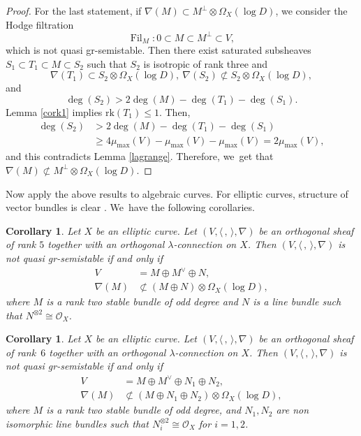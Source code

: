 \documentclass[11pt]{article}
\numberwithin{equation}{section}
\newcommand{\lconnection}{$\lambda$\nobreakdash-con\-nec\-tion\xspace}
\newcommand{\grsemistable}{gr\nobreakdash-semi\-stable\xspace}
\DeclareMathOperator{\Filt}{Fil}
\newcommand{\rk}{\mathrm{rk}}
\theoremstyle{plain}
\newtheorem{cor}[thm]{Corollary}
\theoremstyle{definition}
\begin{document}
\begin{proof}
For the last statement, if $ \nabla(M)\subset M^\perp\otimes\Omega_X(\log D)$, we consider the Hodge filtration
\[
\Filt_{M}:0\subset M\subset M^\perp\subset V,
\]
which is not quasi \grsemistable. Then there exist saturated subsheaves $S_1\subset T_1\subset M\subset S_2$ such that $S_2$ is isotropic of rank three and
\[
\nabla(T_1)\subset S_2\otimes\Omega_X(\log D),\ \nabla(S_2)\not\subset S_2\otimes\Omega_X(\log D),
\]
and
\[
\deg(S_2)>2\deg(M)-\deg(T_1)-\deg(S_1).
\]
Lemma \ref{cork1} implies $\rk(T_1)\leq1$. Then,
\begin{align*}
\deg(S_2) & >2\deg(M)-\deg(T_1)-\deg(S_1) \\
& \geq 4\mu_{\max}(V)-\mu_{\max}(V)-\mu_{\max}(V)=2\mu_{\max}(V),
\end{align*}
and this contradicts Lemma \ref{lagrange}. Therefore, we~get that $ \nabla(M)\not\subset M^\perp\otimes\Omega_X(\log D)$.
\end{proof}

Now apply the above results to algebraic curves. For elliptic curves, structure of vector bundles is clear \cite{A57,T93}. We~have the following corollaries.

\begin{cor}
Let $X$ be an elliptic curve. Let $(V,\langle \,, \, \rangle,\nabla)$ be an orthogonal sheaf of rank $5$ together with an orthogonal \lconnection on $X$. Then $(V,\langle \,, \, \rangle,\nabla)$ is not quasi \grsemistable if and only if
\begin{align*}
V&=M\oplus M^\vee\oplus N,
\\
\nabla(M)&\not\subset (M\oplus N)\otimes\Omega_X(\log D),
\end{align*}
where $M$ is a rank two stable bundle of odd degree and $N$ is a line bundle such that $N^{\otimes 2}\cong \mathcal{O}_X$.
\end{cor}

\begin{cor}\label{elliptic6}
Let $X$ be an elliptic curve. Let $(V,\langle \,, \, \rangle,\nabla)$ be an orthogonal sheaf of rank~$6$ together with an orthogonal \lconnection on $X$. Then $(V,\langle \,, \, \rangle,\nabla)$ is not quasi \grsemistable if and only if
\begin{align*}
V&=M\oplus M^\vee\oplus N_1\oplus N_2,
\\
\nabla(M)&\not\subset (M\oplus N_1\oplus N_2)\otimes\Omega_X(\log D),
\end{align*}
where $M$ is a rank two stable bundle of odd degree, and $N_1,N_2$ are non isomorphic line bundles such that $N_i^{\otimes 2}\cong \mathcal{O}_X$ for $i=1,2$.
\end{cor}
\end{document}
